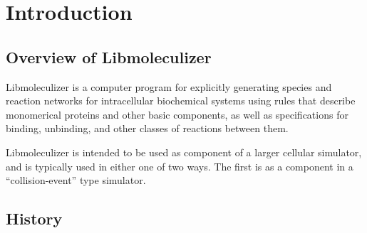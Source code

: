 \chapter{Introduction}
\section{Overview of Libmoleculizer}
Libmoleculizer is a computer program for explicitly generating species
and reaction networks for intracellular biochemical systems using
rules that describe monomerical proteins and other basic
components, as well as specifications for binding, unbinding, and
other classes of reactions between them.  

Libmoleculizer is intended to be used as component of a larger
cellular simulator, and is typically used in either one of two ways.
The first is as a component in a ``collision-event'' type simulator.



\section{History}

